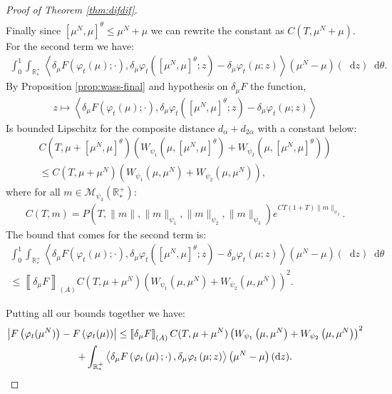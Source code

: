 \documentclass[11pt,a4paper]{article}
\newcommand{\RRP}{\mathbb{R}^+_*}
\newcommand{\MC}{\mathcal{M}}
\newcommand{\A}{(A)}
\newcommand{\brac}[1]{\left\langle#1\right\rangle}
\newcommand{\dd}{\mathop{}\!\mathrm{d}}
\begin{document}
\begin{proof}[Proof of Theorem \ref{thm:difdif}]
\begin{multline*}
    \end{multline*}
    Finally since $\left[\mu^N,\mu \right]^\theta \leq \mu^N + \mu$ we can rewrite the constant as $C(T,\mu^N + \mu)$. For the second term we have:
    \begin{align*}
        \int_0^1 \int_{\RRP} \brac{\delta_\mu F\left(\varphi_t \left(\mu\right);\cdot \right), \delta_\mu \varphi_t\left(\left[\mu^N,\mu \right]^\theta;z \right) -  \delta_\mu \varphi_t\left(\mu;z \right)} \left(\mu^N - \mu\right)(\dd z)\dd \theta.
    \end{align*}
    By Proposition \ref{prop:wass-final} and hypothesis on $\delta_\mu F$ the function,
    \begin{align*}
        z \mapsto \brac{\delta_\mu F\left(\varphi_t \left(\mu\right);\cdot \right), \delta_\mu \varphi_t\left(\left[\mu^N,\mu \right]^\theta;z \right) -  \delta_\mu \varphi_t\left(\mu;z \right)}
    \end{align*}
    Is bounded Lipschitz for the composite distance $d_\alpha + d_{2\alpha}$ with a constant below: 
    \begin{multline*}
        C(T,\mu + \left[\mu^N,\mu \right]^\theta)\left(W_{\psi_1}\left(\mu,\left[\mu^N,\mu \right]^\theta\right) +W_{\psi_2}\left(\mu,\left[\mu^N,\mu \right]^\theta\right) \right) \\
        \leq C(T,\mu + \mu^N)\left(W_{\psi_1}\left(\mu,\mu^N\right) +W_{\psi_2}\left(\mu,\mu^N\right) \right),
    \end{multline*}
    where for all $m \in \MC_{\psi_3}(\RRP)$:
    \begin{align*}
        C(T,m) = P(T,\|m\|,\|m\|_{\psi_1},\|m\|_{\psi_2},\|m\|_{\psi_3})e^{CT(1 + T)\|m\|_{\psi_2}}.
    \end{align*}
    The bound that comes for the second term is:
    \begin{multline*}
        \int_0^1 \int_{\RRP} \brac{\delta_\mu F\left(\varphi_t \left(\mu\right);\cdot \right), \delta_\mu \varphi_t\left(\left[\mu^N,\mu \right]^\theta;z \right) -  \delta_\mu \varphi_t\left(\mu;z \right)} \left(\mu^N - \mu\right)(\dd z)\dd \theta \\
        \leq \left\llbracket \delta_\mu F \right\rrbracket_{\A} C(T,\mu + \mu^N)\left(W_{\psi_1}\left(\mu,\mu^N\right) +W_{\psi_2}\left(\mu,\mu^N\right) \right)^2.
    \end{multline*}

    Putting all our bounds together we have:
    \begin{multline*}
        \left|F\left(\varphi_t(\mu^N)\right) - F\left(\varphi_t(\mu)\right) \right| \leq \left\llbracket \delta_\mu F \right\rrbracket_{\A}C(T,\mu + \mu^N)\left(W_{\psi_1}\left(\mu,\mu^N\right) +W_{\psi_2}\left(\mu,\mu^N\right) \right)^2 \\
        + \int_{\RRP} \brac{\vphantom{A^2}\delta_\mu F\left(\varphi_t \left(\mu\right);\cdot \right), \delta_\mu \varphi_t\left(\mu;z \right)} \left(\mu^N - \mu\right)(\dd z).
    \end{multline*}
\end{proof}
\end{document}
